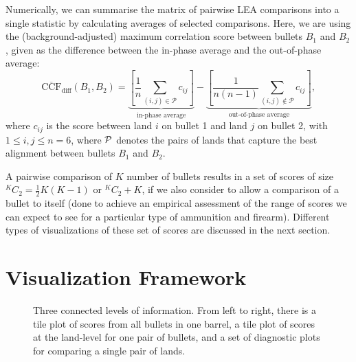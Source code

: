 \documentclass[
  12pt]{article}
\begin{document}
Numerically, we can summarise the matrix of pairwise LEA comparisons
into a single statistic by calculating averages of selected comparisons.
Here, we are using the (background-adjusted) maximum correlation score
\citep{juOpenSourceImplementationCMPS2022} between bullets \(B_1\) and
\(B_2\), given as the difference between the in-phase average and the
out-of-phase average: \[
\mathrm{\overline{CCF}_{diff}}(B_1, B_2) = \underbrace{\left[  \frac{1}{n} \sum_{(i,j) \in \mathcal{P}} c_{ij}\right]}_{\text{in-phase average}} - \underbrace{\left[  \frac{1}{n(n-1)} \sum_{(i,j) \notin \mathcal{P}} c_{ij}\right]}_{\text{out-of-phase average}},
\] where \(c_{ij}\) is the score between land \(i\) on bullet 1 and land
\(j\) on bullet 2, with \(1 \le i, j \le n=6\), where \({\cal P}\)
denotes the pairs of lands that capture the best alignment between
bullets \(B_1\) and \(B_2\).

A pairwise comparison of \(K\) number of bullets results in a set of
scores of size \(^KC_2 = \frac{1}{2}K(K-1)\) or \(^KC_2 + K\), if we
also consider to allow a comparison of a bullet to itself (done to
achieve an empirical assessment of the range of scores we can expect to
see for a particular type of ammunition and firearm). Different types of
visualizations of these set of scores are discussed in the next section.

\section{Visualization Framework}\label{sec-visuals}

\begin{figure}


\caption{\label{fig-tool-pipeline}Three connected levels of information.
From left to right, there is a tile plot of scores from all bullets in
one barrel, a tile plot of scores at the land-level for one pair of
bullets, and a set of diagnostic plots for comparing a single pair of
lands.}

\end{figure}%
\end{document}
